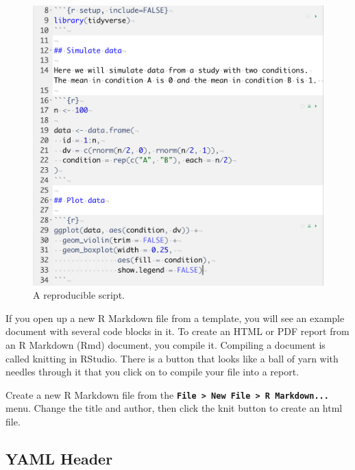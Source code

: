 \documentclass[
  oneside]{book}
\begin{document}
\begin{figure}

{\centering \includegraphics[width=1\linewidth]{images/repro/reproducible_script} 

}

\caption{A reproducible script.}\label{fig:img-reproducible-script}
\end{figure}

If you open up a new R Markdown file from a template, you will see an example document with several code blocks in it. To create an HTML or PDF report from an R Markdown (Rmd) document, you compile it. Compiling a document is called knitting in RStudio. There is a button that looks like a ball of yarn with needles through it that you click on to compile your file into a report.

\begin{try}
Create a new R Markdown file from the \textbf{\texttt{File\ \textgreater{}\ New\ File\ \textgreater{}\ R\ Markdown...}} menu. Change the title and author, then click the knit button to create an html file.

\end{try}

\hypertarget{yaml-header}{%
\subsection{YAML Header}\label{yaml-header}}
\end{document}
